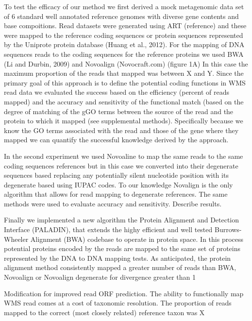 To test the efficacy of our method we first derived a mock metagenomic data set of 6 standard well annotated reference genomes with diverse gene contents and base compoitions.  Read datasets were generated using ART (reference) and these were mapped to the reference coding sequences or protein sequences represented by the Uniprote protein database (Huang et al., 2012).  For the mapping of DNA sequences reads to the coding sequences for the reference proteins we used BWA (Li and Durbin, 2009) and Novoalign (Novocraft.com) (figure 1A)  In this case the maximum proportion of the reads that mapped was between X and Y.  Since the primary goal of this approach is to define the potential coding functions in WMS read data we evaluated the success based on the efficiency (percent of reads mapped) and the accuracy and sensitivity of the functional match (based on the degree of matching of the gGO terms between the source of the read and the protein to which it mapped  (see supplemental methods).  Specifically because we know the GO terms associated with the read and those of the gene where they mapped we can quantify the successful knowledge derived by the approach.

In the second experiment we used Novoaline to map the same reads to the same coding sequences references but in this case we converted into their degenerate sequences based replacing any potentially silent nucleotide position with its degenerate based using IUPAC codes.  To our knowledge Novalign is the only algorithm that allows for read mapping to degenerate references.  The same methods were used to evaluate accuracy and sensitivity.  Describe results.

Finally we implemented a new algorithm the Protein Alignment and Detection Interface (PALADIN), that extends the highy efficient and well tested Burrows-Wheeler Alignment (BWA) codebase to operate in protein space.  In this process potential proteins encoded by the reads are mapped to the same set of proteins represented by the DNA to DNA  mapping tests.  As anticipated, the protein alignment method consistently mapped a greater number of reads than BWA, Novoalign or Novoalign degenerate for divergence greater than 1%

Modification for improved read ORF prediction. 
The ability to functionally map WMS read comes at a cost of taxonomic resolution.  The proportion of reads mapped to the correct (most closely related) reference taxon was X %


  
  